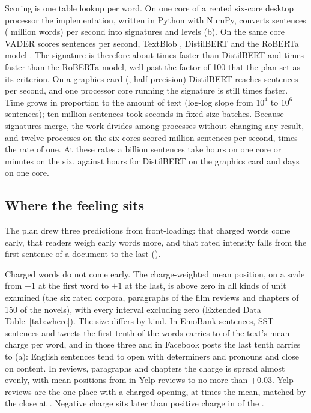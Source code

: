 Scoring is one table lookup per word. On one core of a rented six-core desktop processor the implementation, written in Python with NumPy, converts \sgwRate{} sentences (\sgwWords{} million words) per second into signatures and levels (b). On the same core VADER scores \vaderRate{} sentences per second, TextBlob \blobRate, DistilBERT \distilRate{} and the RoBERTa model \robertaRate. The signature is therefore about \speedDistil{} times faster than DistilBERT and \speedRoberta{} times faster than the RoBERTa model, well past the factor of 100 that the plan set as its criterion. On a graphics card (\gpuName, half precision) DistilBERT reaches \distilGpuHalf{} sentences per second, and one processor core running the signature is still \speedDistilGpu{} times faster. Time grows in proportion to the amount of text (log-log slope \scalingSlope{} from $10^4$ to $10^6$ sentences); ten million sentences took \streamSeconds{} seconds in fixed-size batches. Because signatures merge, the work divides among processes without changing any result, and twelve processes on the six cores scored \sgwAllCores{} million sentences per second, \parSpeedup{} times the rate of one. At these rates a billion sentences take \billionHours{} hours on one core or \billionMinutesAll{} minutes on the six, against \billionHoursDistilGpu{} hours for DistilBERT on the graphics card and \billionDaysDistil{} days on one core.

\subsection{Where the feeling sits}

The plan drew three predictions from front-loading: that charged words come early, that readers weigh early words more, and that rated intensity falls from the first sentence of a document to the last ().

Charged words do not come early. The charge-weighted mean position, on a scale from $-1$ at the first word to $+1$ at the last, is above zero in all \whereUnits{} kinds of unit examined (the six rated corpora, paragraphs of the film reviews and chapters of 150 of the novels), with every interval excluding zero (Extended Data Table~\ref{tab:where}). The size differs by kind. In EmoBank sentences, SST sentences and tweets the first tenth of the words carries \firstDecileLo{} to \firstDecileHi{} of the text's mean charge per word, and in those three and in Facebook posts the last tenth carries \lastDecileLo{} to \lastDecileHi{} (a): English sentences tend to open with determiners and pronouns and close on content. In reviews, paragraphs and chapters the charge is spread almost evenly, with mean positions from \whereMin{} in Yelp reviews to no more than $+0.03$. Yelp reviews are the one place with a charged opening, at \yelpFirst{} times the mean, matched by the close at \yelpLast. Negative charge sits later than positive charge in \whereDolorLater{} of the \whereUnits.

